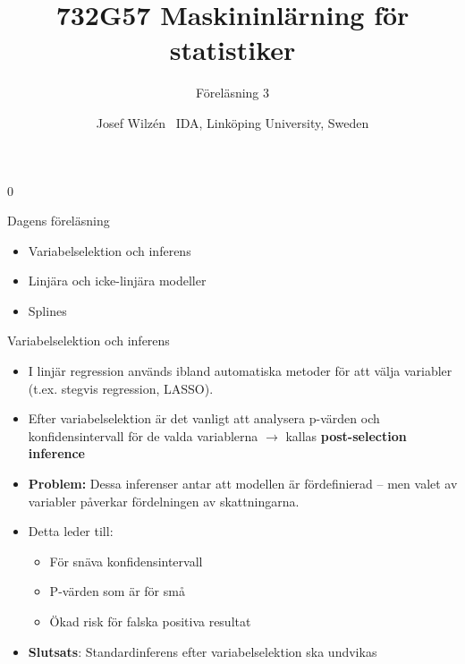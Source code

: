 0\documentclass[10pt,english]{beamer}
\title{732G57 Maskininlärning för statistiker }
\subtitle{Föreläsning 3}
\date{}
\author{Josef Wilzén \ IDA, Linköping University, Sweden}
\begin{document}
\maketitle

\begin{frame}{Dagens föreläsning}

    \begin{itemize}
        \item Variabelselektion och inferens
        \item Linjära och icke-linjära modeller
        \item Splines
    \end{itemize}
    
\end{frame}


\begin{frame}{Variabelselektion och inferens}
\begin{itemize}
    \item I linjär regression används ibland automatiska metoder för att välja variabler (t.ex. stegvis regression, LASSO).
    \item Efter variabelselektion är det vanligt att analysera p-värden och konfidensintervall för de valda variablerna $\rightarrow$ kallas \textbf{post-selection inference}
    \item \textbf{Problem:} Dessa inferenser antar att modellen är fördefinierad – men valet av variabler påverkar fördelningen av skattningarna.
    \item Detta leder till:
    \begin{itemize}
        \item För snäva konfidensintervall
        \item P-värden som är för små
        \item Ökad risk för falska positiva resultat
    \end{itemize}
    \item \textbf{Slutsats}: Standardinferens efter variabelselektion ska undvikas
\end{itemize}
\end{frame}
\end{document}
